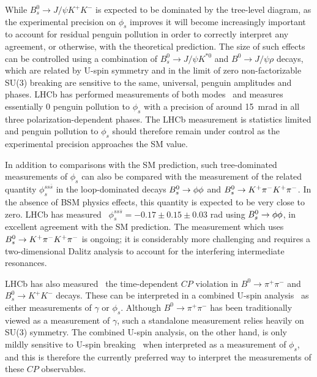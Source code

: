 While $B^0_s \to J/\psi K^+ K^-$ is expected to be dominated by the tree-level diagram,
as the experimental precision on $\phi_s$ improves it will become increasingly important
to account for residual penguin pollution in order to correctly interpret any agreement,
or otherwise, with the theoretical prediction. The size of such effects can be controlled
using a combination of $B^0_s \to J/\psi K^{*0}$ and $B^0 \to J/\psi \rho$ decays,
which are related by U-spin symmetry and in the limit of zero non-factorizable SU(3)
breaking are sensitive to the same, universal, penguin amplitudes and phases.
LHCb has performed measurements of both modes~\cite{LHCbJPsiKst,LHCbJPsiRho} and
measures essentially $0$ penguin pollution to $\phi_s$ with a precision of around 15~mrad
in all three polarization-dependent phases. The LHCb measurement is statistics limited
and penguin pollution to $\phi_s$ should therefore
remain under control as the experimental precision approaches the SM value.

In addition to comparisons with the SM prediction, such tree-dominated measurements of $\phi_s$ can also be compared with the measurement
of the related quantity $\phi_s^{ss\overline{s}}$ in the loop-dominated decays ${{B}^0_{s}} \rightarrow \phi\phi$ and ${{B}^0_{s}}\rightarrow {\ensuremath{{K}^+}}\pi^-{{K}^+}\pi^-$.
In the absence of BSM physics effects, this quantity is expected to be very close to zero.
LHCb has measured~\cite{LHCbPHIPHI} $\phi_s^{ss\overline{s}} = -0.17 \pm 0.15 \pm 0.03$ rad using
${{B}^0_{s}}\rightarrow \phi\phi$, in excellent agreement with the SM prediction. The measurement
which uses ${{B}^0_{s}}\rightarrow {\ensuremath{{K}^+}}\pi^-{{K}^+}\pi^-$ is ongoing; it is considerably more challenging and
requires a two-dimensional Dalitz analysis to account
for the interfering intermediate resonances. 

LHCb has also measured~\cite{LHCbB2hhTDCPV} the time-dependent $CP$ violation in $B^0 \to \pi^+ \pi^-$ and $B^0_s \to K^+ K^-$ decays.
These can be interpreted in a combined U-spin analysis~\cite{} as either measurements of $\gamma$ or $\phi_s$.
Although $B^0 \to \pi^+ \pi^-$ has been traditionally viewed as a measurement of $\gamma$, such a standalone
measurement relies heavily on SU(3) symmetry. The combined U-spin analysis, on the other hand, is only mildly sensitive
to U-spin breaking~\cite{} when interpreted as a measurement of $\phi_s$, and this is therefore the currently preferred way
to interpret the measurements of these $CP$ observables.

